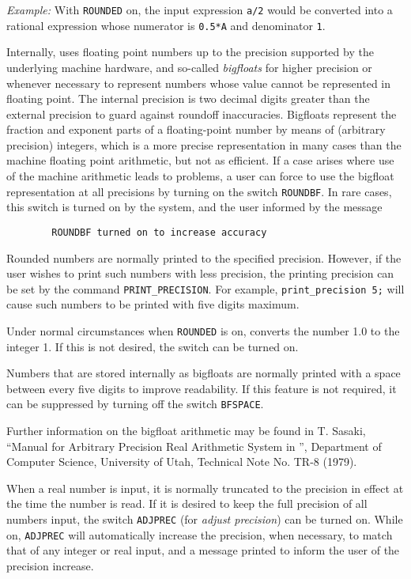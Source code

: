 {\it Example:} With {\tt ROUNDED} on, the input expression {\tt a/2} would
be converted into a rational expression whose numerator is {\tt 0.5*A} and
denominator {\tt 1}.

Internally, {\REDUCE} uses floating point numbers up to the precision
supported by the underlying machine hardware, and so-called {\em
bigfloats} for higher precision or whenever necessary to represent numbers
whose value cannot be represented in floating point.  The internal
precision is two decimal digits greater than the external precision to
guard against roundoff inaccuracies.  Bigfloats represent the fraction and
exponent parts of a floating-point number by means of (arbitrary
precision) integers, which is a more precise representation in many cases
than the machine floating point arithmetic, but not as efficient.  If a
case arises where use of the machine arithmetic leads to problems, a user
can force {\REDUCE} to use the bigfloat representation at all precisions by
turning on the switch {\tt ROUNDBF}.  In rare cases,
this switch is turned on by the system, and the user informed by the
message
\begin{verbatim}
        ROUNDBF turned on to increase accuracy
\end{verbatim}

Rounded numbers are normally printed to the specified precision.  However,
if the user wishes to print such numbers with less precision, the printing
precision can be set by the command {\tt PRINT\_PRECISION}.
 For example, {\tt print\_precision 5;} will
cause such numbers to be printed with five digits maximum.

Under normal circumstances when {\tt ROUNDED} is on, {\REDUCE} converts the
number 1.0 to the integer 1.  If this is not desired, the switch
 can be turned on.

Numbers that are stored internally as bigfloats are normally printed with
a space between every five digits to improve readability.  If this
feature is not required, it can be suppressed by turning off the switch
{\tt BFSPACE}.

Further information on the bigfloat arithmetic may be found in T. Sasaki,
``Manual for Arbitrary Precision Real Arithmetic System in {\REDUCE}'',
Department of Computer Science, University of Utah, Technical Note No.
TR-8 (1979).

When a real number is input, it is normally truncated to the precision in
effect at the time the number is read.  If it is desired to keep the full
precision of all numbers input, the switch {\tt ADJPREC}
(for {\em adjust precision\/}) can be turned on.  While on, {\tt ADJPREC}
will automatically increase the precision, when necessary, to match that
of any integer or real input, and a message printed to inform the user of
the precision increase.

